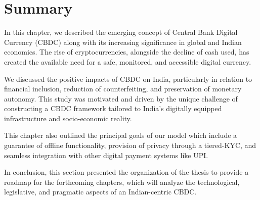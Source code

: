 \section{Summary}
\label{chp1.summary}

In this chapter, we described the emerging concept of Central Bank Digital Currency (CBDC) along with its increasing significance in global and Indian economics. The rise of cryptocurrencies, alongside the decline of cash used, has created the available need for a safe, monitored, and accessible digital currency.

We discussed the positive impacts of CBDC on India, particularly in relation to financial inclusion, reduction of counterfeiting, and preservation of monetary autonomy. This study was motivated and driven by the unique challenge of constructing a CBDC framework tailored to India’s digitally equipped infrastructure and socio-economic reality.

This chapter also outlined the principal goals of our model which include a guarantee of offline functionality, provision of privacy through a tiered-KYC, and seamless integration with other digital payment systems like UPI.

In conclusion, this section presented the organization of the thesis to provide a roadmap for the forthcoming chapters, which will analyze the technological, legislative, and pragmatic aspects of an Indian-centric CBDC.



